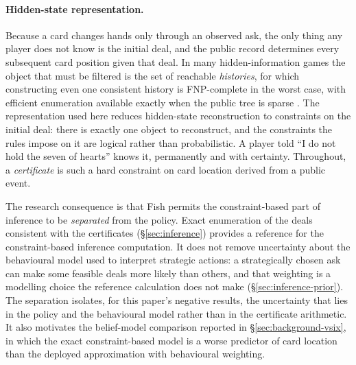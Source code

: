 \paragraph{Hidden-state representation.}
Because a card changes hands only through an observed ask, the only thing any player does not know is
the initial deal, and the public record determines every subsequent card position given that deal. In
many hidden-information games the object that must be filtered is the set of reachable
\emph{histories}, for which constructing even one consistent history is FNP-complete in the worst
case, with efficient enumeration available exactly when the public tree is sparse
\cite{solinas-history}. The representation used here reduces hidden-state reconstruction to
constraints on the initial deal: there is exactly one object to reconstruct, and the constraints the
rules impose on it are logical rather than probabilistic. A player told ``I do not hold the seven of
hearts'' knows it, permanently and with certainty. Throughout, a \emph{certificate} is such a hard
constraint on card location derived from a public event.

The research consequence is that Fish permits the constraint-based part of inference to be
\emph{separated} from the policy. Exact enumeration of the deals consistent with the certificates
(\S\ref{sec:inference}) provides a reference for the constraint-based inference computation. It
does not remove uncertainty about the behavioural model used to interpret strategic actions: a
strategically chosen ask can make some feasible deals more likely than others, and that weighting
is a modelling choice the reference calculation does not make (\S\ref{sec:inference-prior}). The
separation isolates, for this paper's negative results, the uncertainty that lies in the policy and
the behavioural model rather than in the certificate arithmetic. It also motivates the belief-model
comparison reported in \S\ref{sec:background-vsix}, in which the exact constraint-based model is a
worse predictor of card location than the deployed approximation with behavioural weighting.


